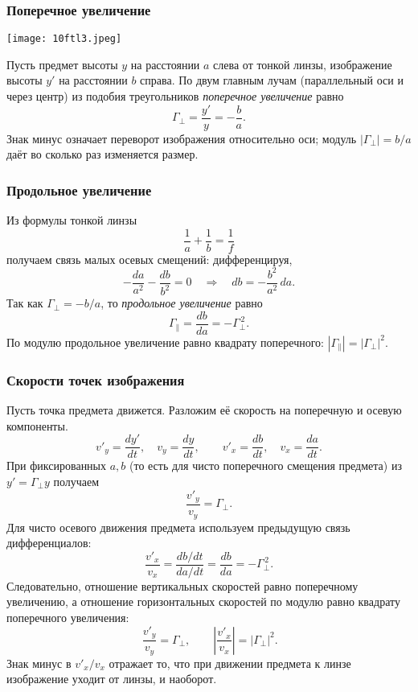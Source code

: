 \documentclass[12pt, a4paper]{article}%
\begin{document}
\subsubsection*{Поперечное увеличение}

\begin{center}
\texttt{[image: 10ftl3.jpeg]}
\label{fig:mpr}
\end{center}

Пусть предмет высоты $y$ на расстоянии $a$ слева от тонкой линзы, изображение высоты $y'$ на расстоянии $b$ справа. По двум главным лучам (параллельный оси и через центр) из подобия треугольников \textit{поперечное увеличение} равно
\[
\Gamma_{\perp}=\frac{y'}{y}=-\frac{b}{a}.
\]
Знак минус означает переворот изображения относительно оси; модуль $|\Gamma_{\perp}|=b/a$ даёт во сколько раз изменяется размер.

\subsubsection*{Продольное увеличение}
Из формулы тонкой линзы
\[
\frac{1}{a}+\frac{1}{b}=\frac{1}{f}
\]
получаем связь малых осевых смещений: дифференцируя,
\[
-\frac{da}{a^2}-\frac{db}{b^2}=0
\quad\Longrightarrow\quad
db=-\frac{b^2}{a^2}\,da.
\]
Так как $\Gamma_{\perp}=-b/a$, то \textit{продольное увеличение} равно
\[
\Gamma_{\parallel}=\frac{db}{da}=-\Gamma_{\perp}^{\,2}.
\]
По модулю продольное увеличение равно квадрату поперечного: $|\Gamma_{\parallel}|=|\Gamma_{\perp}|^2$.

\subsubsection*{Скорости точек изображения}
Пусть точка предмета движется. Разложим её скорость на поперечную и осевую компоненты.
\[
v'_y=\frac{dy'}{dt},\quad v_y=\frac{dy}{dt},\qquad
v'_x=\frac{db}{dt},\quad v_x=\frac{da}{dt}.
\]
При фиксированных $a,b$ (то есть для чисто поперечного смещения предмета) из $y'=\Gamma_{\perp}y$ получаем
\[
\frac{v'_y}{v_y}=\Gamma_{\perp}.
\]
Для чисто осевого движения предмета используем предыдущую связь дифференциалов:
\[
\frac{v'_x}{v_x}=\frac{db/dt}{da/dt}=\frac{db}{da}=-\Gamma_{\perp}^{\,2}.
\]
Следовательно, отношение вертикальных скоростей равно поперечному увеличению, а отношение горизонтальных скоростей по модулю равно квадрату поперечного увеличения:
\[
\boxed{\,\frac{v'_y}{v_y}=\Gamma_{\perp},\qquad \left|\frac{v'_x}{v_x}\right|=|\Gamma_{\perp}|^2.}
\]
Знак минус в $v'_x/v_x$ отражает то, что при движении предмета к линзе изображение уходит от линзы, и наоборот.
\end{document}

